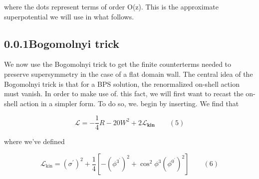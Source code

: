 \documentclass{article}
\begin{document}
where the dots represent terms of order O(z). This is the approximate superpotential we
will use in what follows.


\subsection*{0.0.1Bogomolnyi trick}


We now use the Bogomolnyi trick to get the finite counterterms needed to preserve supersymmetry in the case of a flat domain wall. The central idea of the Bogomolnyi trick is that
for a BPS solution, the renormalized on-shell action must vanish. In order to make use of.
this fact, we will first want to recast the on-shell action in a simpler form. To do so, we.
begin by inserting. We find that


\begin{equation}
\mathcal { L } = - \frac { 1 } { 4 } R - 2 0 W ^ { 2 } + 2 \mathcal { L } _ \mathbf { k i n } \qquad ( 5 )
\end{equation}


where we've defined


\begin{equation}
{ \mathcal { L } } _ { \mathrm { k i n } } = ( \sigma ^ { \prime } ) ^ { 2 } + { \frac { 1 } { 4 } } \left [ - ( { \phi ^ { 3 ^ { \prime } } } ) ^ { 2 } + \cos ^ { 2 } \phi ^ { 3 } ( { \phi ^ { 0 ^ { \prime } } } ) ^ { 2 } \right ] \qquad ( 6 )
\end{equation}
\end{document}
